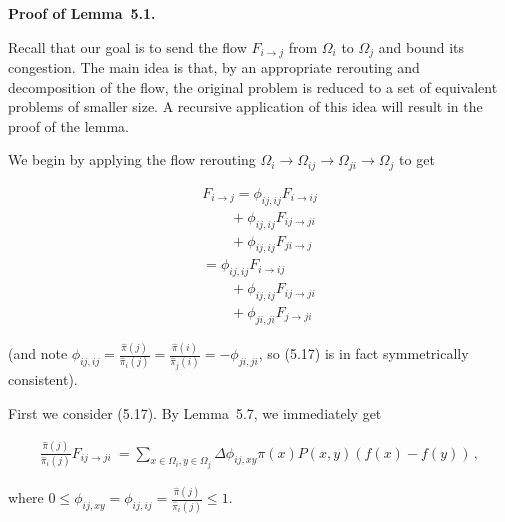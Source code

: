 \documentclass[10pt,a4paper]{article}
\begin{document}
\par\medskip\noindent\textbf{Proof of Lemma 5.1.}\par



Recall that our goal is to send the flow $F_{i\rightarrow j}$ from $\Omega_{i}$ to $\Omega_{j}$ and bound its congestion. The main idea is that, by an appropriate rerouting and decomposition of the flow, the original problem is reduced to a set of equivalent problems of smaller size. A recursive application of this idea will result in the proof of the lemma.\par




We begin by applying the flow rerouting $\Omega_{i}\rightarrow\Omega_{ij}\rightarrow\Omega_{ji}\rightarrow\Omega_{j}$ to get\par


\[\begin{gathered}
\displaystyle F_{i\rightarrow j} \displaystyle=\phi_{ij,ij}F_{i\rightarrow ij} \\
\displaystyle\qquad+\phi_{ij,ij}F_{ij\rightarrow ji} \\
\displaystyle\qquad+\phi_{ij,ij}F_{ji\rightarrow j} \\
\displaystyle=\phi_{ij,ij}F_{i\rightarrow ij} \\
\displaystyle\qquad+\phi_{ij,ij}F_{ij\rightarrow ji} \\
\displaystyle\qquad+\phi_{ji,ji}F_{j\rightarrow ji}
\end{gathered}\]




(and note $\phi_{ij,ij}=\frac{\hat{\pi}(j)}{\hat{\pi}_{i}(j)}=\frac{\hat{\pi}(i)}{\hat{\pi}_{j}(i)}=-\phi_{ji,ji}$, so (5.17) is in fact symmetrically consistent).\par




First we consider (5.17). By Lemma 5.7, we immediately get\par


\[\begin{gathered}
\frac{\hat{\pi}(j)}{\hat{\pi}_{i}(j)}F_{ij\rightarrow ji}\ =\sum_{x\in\Omega_{i},y\in\Omega_{j}}\Delta\phi_{ij,xy}\pi(x)P(x,y)\left(f(x)-f(y)\right)\,,
\end{gathered}\]


where $0\leq\phi_{ij,xy}=\phi_{ij,ij}=\frac{\hat{\pi}(j)}{\hat{\pi}_{i}(j)}\leq 1.$\par
\end{document}
